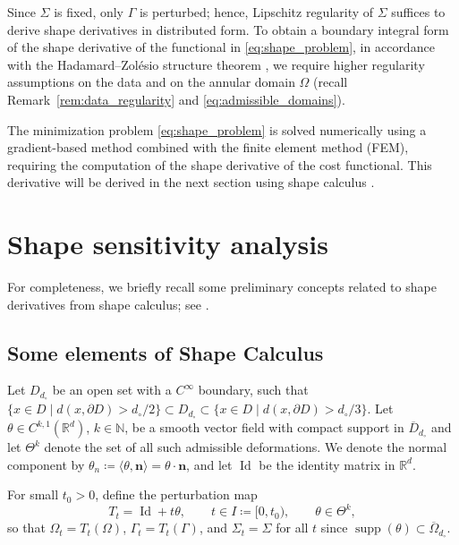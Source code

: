 \documentclass[a4paper,11pt]{article}
\newcommand{\vect}[1]{\boldsymbol{\mathbf{#1}}}
\newcommand{\Id}{\operatorname{Id}}
\newcommand{\intervalI}{I}
\newcommand{\sfTheta}{\Theta}
\newcommand{\VV}{\theta}
\newcommand{\Vn}{\theta_{n}}
\newcommand{\nn}{\vect{n}}
\begin{document}
Since $\varSigma$ is fixed, only $\varGamma$ is perturbed; hence, Lipschitz regularity of $\varSigma$ suffices to derive shape derivatives in distributed form.
To obtain a boundary integral form of the shape derivative of the functional in \eqref{eq:shape_problem}, in accordance with the Hadamard--Zol\'{e}sio structure theorem \cite[Thm.~3.6, p.~479]{DelfourZolesio2011}, we require higher regularity assumptions on the data and on the annular domain $\varOmega$ (recall Remark~\ref{rem:data_regularity} and \eqref{eq:admissible_domains}).


The minimization problem \eqref{eq:shape_problem} is solved numerically using a gradient-based method combined with the finite element method (FEM), requiring the computation of the shape derivative of the cost functional.
This derivative will be derived in the next section using shape calculus \cite{DelfourZolesio2011,HenrotPierre2018,MuratSimon1976,Simon1980,SokolowskiZolesio1992}.  


\section{Shape sensitivity analysis}
\label{sec:Shape_Derivatives}
For completeness, we briefly recall some preliminary concepts related to shape derivatives from shape calculus; see \cite{DelfourZolesio2011,HenrotPierre2018,SokolowskiZolesio1992}.
%
%
\subsection{Some elements of Shape Calculus}\label{subsec:elements_of_shape_calculus}
	Let $D_{d_{\circ}}$ be an open set with a ${C}^{\infty}$ boundary, such that $\{ x \in D \mid \text{$d(x,\partial D) > {d_{\circ}}/2$}\} \subset D_{{{d_{\circ}}}} \subset \{ x\in D \mid \text{$d(x,\partial D) > {d_{\circ}}/3$}\}$. 
	Let $\VV \in {C}^{k,1}(\mathbb{R}^{d})$, $k \in \mathbb{N}$, be a smooth vector field with compact support in $\overline{D}_{d_{\circ}}$ and let $\sfTheta^k$ denote the set of all such admissible deformations.
We denote the normal component by $\Vn \coloneqq \langle \VV, \nn \rangle = \VV \cdot \nn$, and let $\Id$ be the identity matrix in $\mathbb{R}^{d}$.

For small $t_0 > 0$, define the perturbation map
\[
T_t = \Id + t \VV, \qquad t \in \intervalI \coloneqq [0,t_0), \qquad \VV \in \sfTheta^k,
\]
so that $\varOmega_t = T_t(\varOmega)$, $\varGamma_t = T_t(\varGamma)$, and $\varSigma_t = \varSigma$ for all $t$ since $\operatorname{supp}(\VV) \subset \overline{\varOmega}_{d_{\circ}}$.  
\end{document}
